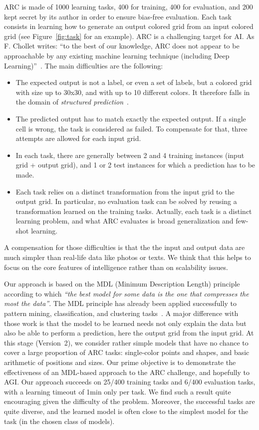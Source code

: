 \documentclass[a4paper]{llncs}
\begin{document}
ARC is made of 1000 learning tasks, 400 for training, 400 for
evaluation, and 200 kept secret by its author in order to ensure
bias-free evaluation. Each task consists in learning how to generate
an output colored grid from an input colored grid (see
Figure~\ref{fig:task} for an example).
%
ARC is a challenging target for AI. As F. Chollet writes: ``to the
best of our knowledge, ARC does not appear to be approachable by any
existing machine learning technique (including Deep
Learning)''~\cite{Chollet2019}. The main difficulties are the
following:
\begin{itemize}
\item The expected output is not a label, or even a set of labels, but
  a colored grid with size up to 30x30, and with up to 10 different
  colors. It therefore falls in the domain of {\em structured
    prediction}~\cite{dietterich2008structured}.
\item The predicted output has to match exactly the expected
  output. If a single cell is wrong, the task is considered as
  failed. To compensate for that, three attempts are allowed for each
  input grid.
\item In each task, there are generally between 2 and 4 training
  instances (input grid + output grid), and 1 or 2 test instances for
  which a prediction has to be made.
\item Each task relies on a distinct transformation from the input
  grid to the output grid. In particular, no evaluation task can be
  solved by reusing a transformation learned on the training
  tasks. Actually, each task is a distinct learning problem, and what
  ARC evaluates is broad generalization and few-shot learning.
\end{itemize}
A compensation for those difficulties is that the the input and output
data are much simpler than real-life data like photos or texts. We
think that this helps to focus on the core features of intelligence
rather than on scalability issues.

Our approach is based on the MDL (Minimum Description Length)
principle~\cite{Rissanen1978,Grunwald2019} according to which {\em ``the best
model for some data is the one that compresses the most the data''}.
%
The MDL principle has already been applied successfully to pattern
mining, classification, and clustering tasks~\cite{KRIMP2011}.
%
A major difference with those work is that the model to be learned
needs not only explain the data but also be able to perform a
prediction, here the output grid from the input grid.
%
At this stage (Version~2), we consider rather simple models that have
no chance to cover a large proportion of ARC tasks: single-color
points and shapes, and basic arithmetic of positions and sizes. Our
prime objective is to demonstrate the effectiveness of an MDL-based
approach to the ARC challenge, and hopefully to AGI. Our approach
succeeds on 25/400 training tasks and 6/400 evaluation tasks, with a
learning timeout of 1min only per task. We find such a result quite
encouraging given the difficulty of the problem. Moreover, the
successful tasks are quite diverse, and the learned model is often
close to the simplest model for the task (in the chosen class of
models).
\end{document}
